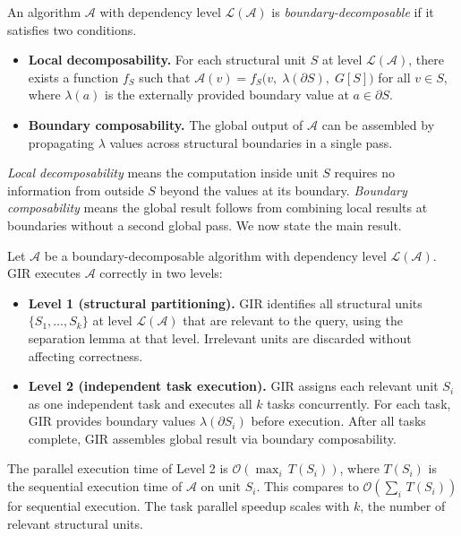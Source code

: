 
\begin{definition}
\label{def:boundary_decomp}
An algorithm $\mathcal{A}$ with dependency level $\mathcal{L}(\mathcal{A})$ is
\textit{boundary-decomposable} if it satisfies two conditions.
\begin{itemize}[leftmargin=*]
  \item \textbf{Local decomposability.}
    For each structural unit $S$ at level $\mathcal{L}(\mathcal{A})$,
    there exists a function $f_S$ such that
    $\mathcal{A}(v) = f_S\bigl(v,\; \lambda(\partial S),\; G[S]\bigr)$
    for all $v \in S$,
    where $\lambda(a)$ is the externally provided boundary value at $a \in \partial S$.
  \item \textbf{Boundary composability.}
    The global output of $\mathcal{A}$ can be assembled by propagating
    $\lambda$ values across structural boundaries in a single pass.
\end{itemize}
\end{definition}

\textit{Local decomposability} means the computation inside unit $S$ requires
no information from outside $S$ beyond the values at its boundary.
\textit{Boundary composability} means the global result follows from combining local results
at boundaries without a second global pass.
We now state the main result.

\begin{theorem}
\label{thm:two_level}
Let $\mathcal{A}$ be a boundary-decomposable algorithm with dependency level
$\mathcal{L}(\mathcal{A})$.
GIR executes $\mathcal{A}$ correctly in two levels:
\begin{itemize}[leftmargin=*]
  \item \textbf{Level 1 (structural partitioning).}
    GIR identifies all structural units $\{S_1, \ldots, S_k\}$ at level $\mathcal{L}(\mathcal{A})$
    that are relevant to the query, using the separation lemma at that level.
    Irrelevant units are discarded without affecting correctness.
  \item \textbf{Level 2 (independent task execution).}
    GIR assigns each relevant unit $S_i$ as one independent task
    and executes all $k$ tasks concurrently.
    For each task, GIR provides boundary values $\lambda(\partial S_i)$
    before execution.
    After all tasks complete, GIR assembles global result
    via boundary composability.
\end{itemize}
The parallel execution time of Level 2 is
$\mathcal{O}\!\left(\max_{i}\, T(S_i)\right)$,
where $T(S_i)$ is the sequential execution time of $\mathcal{A}$ on unit $S_i$.
This compares to $\mathcal{O}\!\left(\sum_{i}\, T(S_i)\right)$ for sequential execution.
The task parallel speedup scales with $k$, the number of relevant structural units.
\end{theorem}

